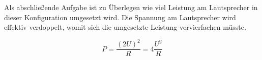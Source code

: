 Als abschließende Aufgabe ist zu Überlegen wie viel Leistung am Lautsprecher in dieser Konfiguration umgesetzt wird. Die Spannung am Lautsprecher wird effektiv verdoppelt, womit sich die umgesetzte Leistung vervierfachen müsste. 

\begin{equation*}
    P = \frac{(2 U)^2}{R} = 4 \frac{U^2}{R}
\end{equation*}